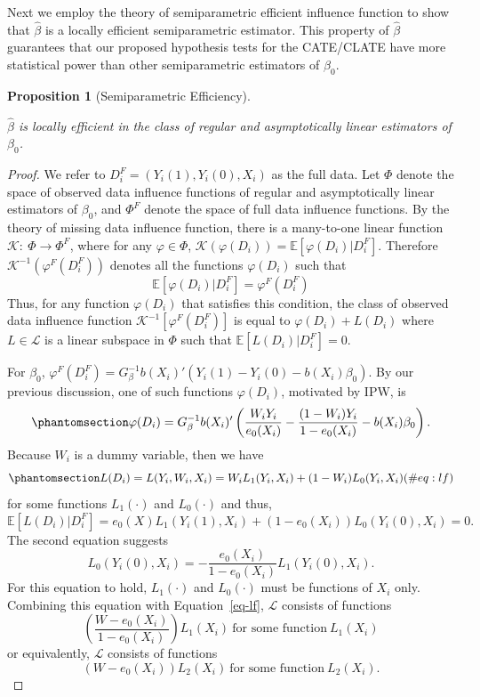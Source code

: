 \documentclass[
  12pt,
  12pt]{article}
\numberwithin{equation}{section}
\theoremstyle{definition}
\theoremstyle{plain}
\newtheorem{proposition}{Proposition}[section]
\theoremstyle{plain}
\theoremstyle{remark}
\begin{document}
Next we employ the theory of semiparametric efficient influence function
to show that \(\hat\beta\) is a locally efficient semiparametric
estimator. This property of \(\hat\beta\) guarantees that our proposed
hypothesis tests for the CATE/CLATE have more statistical power than
other semiparametric estimators of \(\beta_0\).

\begin{proposition}[Semiparametric
Efficiency]\protect\hypertarget{prp-efficiency}{}\label{prp-efficiency}

\(\hat\beta\) is locally efficient in the class of regular and
asymptotically linear estimators of \(\beta_0\).

\end{proposition}

\begin{proof}
We refer to \(D_i^F = (Y_i(1), Y_i(0), X_i)\) as the full data. Let
\(\Phi\) denote the space of observed data influence functions of
regular and asymptotically linear estimators of \(\beta_0\), and
\(\Phi^F\) denote the space of full data influence functions. By the
theory of missing data influence function, there is a many-to-one linear
function \(\mathcal{K}: \ \Phi \rightarrow \Phi^F\), where for any
\(\varphi \in \Phi\),
\(\mathcal{K}(\varphi(D_i)) = \mathbb{E}[\varphi(D_i)|D_i^F]\).
Therefore \(\mathcal{K}^{-1}(\varphi^F(D_i^F))\) denotes all the
functions \(\varphi(D_i)\) such that \[
\mathbb{E}[\varphi(D_i)|D_i^F] = \varphi^F(D_i^F)
\] Thus, for any function \(\varphi(D_i)\) that satisfies this
condition, the class of observed data influence function
\(\mathcal{K}^{-1}[\varphi^F(D_i^F)]\) is equal to
\(\varphi(D_i) + L(D_i)\) where \(L \in \mathcal{L}\) is a linear
subspace in \(\Phi\) such that \(\mathbb{E}[L(D_i)|D_i^F] = 0\).

For \(\beta_0\),
\(\varphi^F(D_i^F) = G_\beta^{-1}b(X_i)'(Y_i(1) - Y_i(0) - b(X_i)\beta_0)\).
By our previous discussion, one of such functions \(\varphi(D_i)\),
motivated by IPW, is \begin{equation}\phantomsection\label{eq-ipwif}{
\varphi(D_i) = G_\beta^{-1}b(X_i)'\left(\frac{W_iY_i}{e_0(X_i)} - \frac{(1 - W_i)Y_i}{1 - e_0(X_i)} - b(X_i)\beta_0\right).
}\end{equation} Because \(W_i\) is a dummy variable, then we have
\begin{equation}\phantomsection\label{eq-lf}{
L(D_i) = L(Y_i, W_i, X_i) = W_iL_1(Y_i, X_i) + (1 - W_i)L_0(Y_i, X_i)
(\#eq:lf)
}\end{equation} for some functions \(L_1(\cdot)\) and \(L_0(\cdot)\) and
thus, \[
\mathbb{E}[L(D_i)|D_i^F] = e_0(X)L_1(Y_i(1), X_i) + (1 - e_0(X_i))L_0(Y_i(0), X_i) = 0.
\] The second equation suggests \[
L_0(Y_i(0), X_i) = -\frac{e_0(X_i)}{1 - e_0(X_i)}L_1(Y_i(0), X_i).
\] For this equation to hold, \(L_1(\cdot)\) and \(L_0(\cdot)\) must be
functions of \(X_i\) only. Combining this equation with
Equation~\ref{eq-lf}, \(\mathcal{L}\) consists of functions \[
\left(\frac{W - e_0(X_i)}{1 - e_0(X_i)}\right)L_1(X_i) \ \text{for some function} \ L_1(X_i)
\] or equivalently, \(\mathcal{L}\) consists of functions \[
(W - e_0(X_i))L_2(X_i) \ \text{for some function} \ L_2(X_i).
\]


\end{proof}
\end{document}
